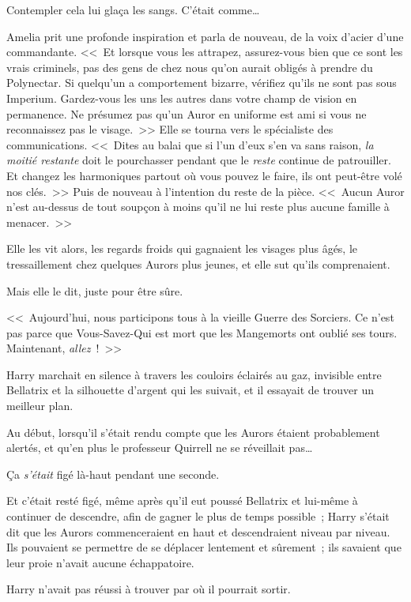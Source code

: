 Contempler cela lui glaça les sangs. C'était comme…

Amelia prit une profonde inspiration et parla de nouveau, de la voix d'acier d'une commandante. <<~Et lorsque vous les attrapez, assurez-vous bien que ce sont les vrais criminels, pas des gens de chez nous qu'on aurait obligés à prendre du Polynectar. Si quelqu'un a comportement bizarre, vérifiez qu'ils ne sont pas sous Imperium. Gardez-vous les uns les autres dans votre champ de vision en permanence. Ne présumez pas qu'un Auror en uniforme est ami si vous ne reconnaissez pas le visage.~>> Elle se tourna vers le spécialiste des communications. <<~Dites au balai que si l'un d'eux s'en va sans raison, \emph{la moitié restante} doit le pourchasser pendant que le \emph{reste} continue de patrouiller. Et changez les harmoniques partout où vous pouvez le faire, ils ont peut-être volé nos clés.~>> Puis de nouveau à l'intention du reste de la pièce. <<~Aucun Auror n'est au-dessus de tout soupçon à moins qu'il ne lui reste plus aucune famille à menacer.~>>

Elle les vit alors, les regards froids qui gagnaient les visages plus âgés, le tressaillement chez quelques Aurors plus jeunes, et elle sut qu'ils comprenaient.

Mais elle le dit, juste pour être sûre.

<<~Aujourd'hui, nous participons tous à la vieille Guerre des Sorciers. Ce n'est pas parce que Vous-Savez-Qui est mort que les Mangemorts ont oublié ses tours. Maintenant, \emph{allez}~!~>>

\later

Harry marchait en silence à travers les couloirs éclairés au gaz, invisible entre Bellatrix et la silhouette d'argent qui les suivait, et il essayait de trouver un meilleur plan.

Au début, lorsqu'il s'était rendu compte que les Aurors étaient probablement alertés, et qu'en plus le professeur Quirrell ne se réveillait pas…

Ça \emph{s'était} figé là-haut pendant une seconde.

Et c'était resté figé, même après qu'il eut poussé Bellatrix et lui-même à continuer de descendre, afin de gagner le plus de temps possible~; Harry s'était dit que les Aurors commenceraient en haut et descendraient niveau par niveau. Ils pouvaient se permettre de se déplacer lentement et sûrement~; ils savaient que leur proie n'avait aucune échappatoire.

Harry n'avait pas réussi à trouver par où il pourrait sortir.

